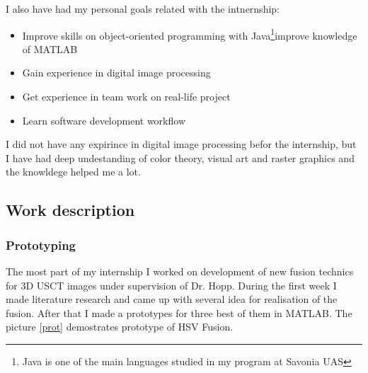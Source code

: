 \documentclass[english]{article}
\begin{document}
I also have had my personal goals related with the intnernship:
\begin{itemize}
\item Improve skills on object-oriented programming with Java\footnote{Java is one of the main languages studied in my program at Savonia UAS}improve knowledge of MATLAB
\item Gain experience in digital image processing
\item Get experience in team work on real-life project
\item Learn software development workflow
\end{itemize}

I did not have any expirince in digital image processing befor the internship, but I have had deep undestanding of color theory, visual art and raster graphics and the knowldege helped me a lot.

\subsection{Work description}
\subsubsection{Prototyping}

The most part of my internship I worked on development of new fusion technics for 3D USCT images under supervision of Dr. Hopp. During the first week I made literature research and came up with several idea for realisation of the fusion. After that I made a prototypes for three best of them in MATLAB. The picture \ref{prot} demostrates prototype of HSV Fusion.\\
\end{document}
